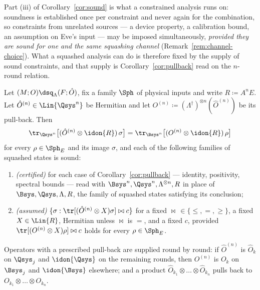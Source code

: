 
Part (iii) of Corollary~\ref{cor:sound} is what a constrained analysis runs
on: soundness is established once per constraint and never again for the
combination, so constraints from unrelated sources --- a device property, a
calibration bound, an assumption on Eve's input --- may be imposed
simultaneously, \emph{provided they are sound for one and the same squashing
channel} (Remark~\ref{rem:channel-choice}). What a squashed analysis can do is
therefore fixed by the supply of sound constraints, and that supply is
Corollary~\ref{cor:pullback} read on the $n$-round relation.

\begin{corollary}
\label{cor:transported}
Let $(M;O)\dsq_{\Lambda}(F;\hat O)$, fix a family $\Sph$ of physical inputs and
write $R\coloneqq A^{n}E$. Let $\hat O^{(n)}\in\Lin{\Qsys^{n}}$ be Hermitian
and let $O^{(n)}\coloneqq(\Lambda^{\dagger})^{\otimes n}(\hat O^{(n)})$ be its
pull-back. Then
\begin{equation}\label{eq:transportn}
  \tr_{\Qsys^{n}}\big[(\hat O^{(n)}\otimes\idon{R})\,\sigma\big]
  =\tr_{\Bsys^{n}}\big[(O^{(n)}\otimes\idon{R})\,\rho\big]
\end{equation}
for every $\rho\in\Sph_E$ and its image $\sigma$, and each of the following
families of squashed states is sound:
\begin{enumerate}[label=(\roman*),leftmargin=3.0em]
\item \emph{(certified)} for each  case of
  Corollary~\ref{cor:pullback} --- identity, positivity, spectral bounds ---
  read with $\Bsys^{n},\Qsys^{n},\Lambda^{\otimes n},R$ in place of
  $\Bsys,\Qsys,\Lambda,R$, the family of squashed states satisfying its
  conclusion;
\item \emph{(assumed)}
  $\{\sigma:\tr[(\hat O^{(n)}\otimes X)\sigma]\bowtie c\}$ for a fixed
  $\bowtie\,\in\{\le,=,\ge\}$, a fixed $X\in\Lin{R}$, Hermitian unless
  $\bowtie$ is $=$, and a fixed $c$, provided
  $\tr[(O^{(n)}\otimes X)\rho]\bowtie c$ holds for every $\rho\in\Sph_E$.
\end{enumerate}
Operators with a prescribed pull-back are supplied round by round: if
$\hat O^{(n)}$ is $\hat O_k$ on $\Qsys_j$ and $\idon{\Qsys}$ on the remaining
rounds, then $O^{(n)}$ is $O_k$ on $\Bsys_j$ and $\idon{\Bsys}$ elsewhere; and
a product $\hat O_{k_1}\otimes\dots\otimes\hat O_{k_n}$ pulls back to
$O_{k_1}\otimes\dots\otimes O_{k_n}$.
\end{corollary}

